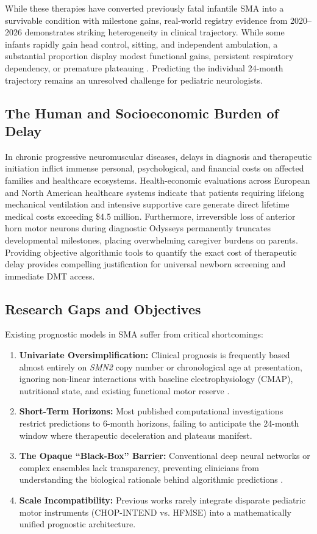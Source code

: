 \documentclass[journal]{IEEEtran}
\begin{document}
While these therapies have converted previously fatal infantile SMA into a survivable condition with milestone gains, real-world registry evidence from 2020--2026 demonstrates striking heterogeneity in clinical trajectory. While some infants rapidly gain head control, sitting, and independent ambulation, a substantial proportion display modest functional gains, persistent respiratory dependency, or premature plateauing \cite{finkel2022restore,hagenacker2020nusinersen,pechmann2023effect,wurster2023long}. Predicting the individual 24-month trajectory remains an unresolved challenge for pediatric neurologists.

\subsection{The Human and Socioeconomic Burden of Delay}
In chronic progressive neuromuscular diseases, delays in diagnosis and therapeutic initiation inflict immense personal, psychological, and financial costs on affected families and healthcare ecosystems. Health-economic evaluations across European and North American healthcare systems indicate that patients requiring lifelong mechanical ventilation and intensive supportive care generate direct lifetime medical costs exceeding \$4.5 million. Furthermore, irreversible loss of anterior horn motor neurons during diagnostic Odysseys permanently truncates developmental milestones, placing overwhelming caregiver burdens on parents. Providing objective algorithmic tools to quantify the exact cost of therapeutic delay provides compelling justification for universal newborn screening and immediate DMT access.

\subsection{Research Gaps and Objectives}
Existing prognostic models in SMA suffer from critical shortcomings:
\begin{enumerate}
    \item \textbf{Univariate Oversimplification:} Clinical prognosis is frequently based almost entirely on \textit{SMN2} copy number or chronological age at presentation, ignoring non-linear interactions with baseline electrophysiology (CMAP), nutritional state, and existing functional motor reserve \cite{devivo2024compound,tizzano2023biomarkers}.
    \item \textbf{Short-Term Horizons:} Most published computational investigations restrict predictions to 6-month horizons, failing to anticipate the 24-month window where therapeutic deceleration and plateaus manifest.
    \item \textbf{The Opaque ``Black-Box'' Barrier:} Conventional deep neural networks or complex ensembles lack transparency, preventing clinicians from understanding the biological rationale behind algorithmic predictions \cite{rudin2019stop,lundberg2017unified}.
    \item \textbf{Scale Incompatibility:} Previous works rarely integrate disparate pediatric motor instruments (CHOP-INTEND vs. HFMSE) into a mathematically unified prognostic architecture.
\end{enumerate}
\end{document}
